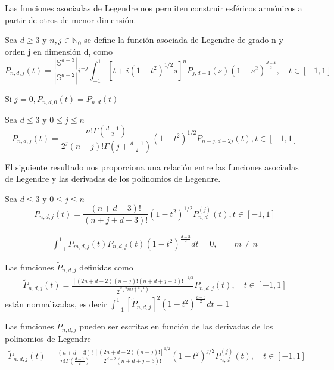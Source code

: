 Las funciones asociadas de Legendre nos permiten construir esféricos armónicos a partir de otros de menor dimensión.
\begin{defn}Sea $d\ge3$ y $n,j \in \mathds{N}_0$ se define la función asociada de Legendre de grado n y orden j en dimensión d, como
	$$
	P_{n,d,j}(t) = \frac{|\mathds{S}^{d-3}|}{|\mathds{S}^{d-2}|}i^{-j} \int_{-1}^{1}\left[t+i(1-t^2)^{1/2}s\right]^n P_{j,d-1}(s)(1-s^2)^{\frac{d-4}{2}}, \quad t\in[-1,1]
	$$
\end{defn}
\begin{rem}Si $j=0, P_{n,d,0}(t)=P_{n,d}(t)$
\end{rem}
\begin{prop}Sea $d\le3$ y $0\le j \le n$ 
	$$	P_{n,d,j}(t) = \frac{n!\Gamma(\frac{d-1}{2})}{2^j(n-j)!\Gamma(j+\frac{d-1}{2})}(1-t^2)^{1/2} P_{n-j,d+2j}(t), t\in[-1,1]$$
\end{prop}
El siguiente resultado nos proporciona una relación entre las funciones asociadas de Legendre y las derivadas de los polinomios de Legendre.
\begin{prop}Sea $d\le3$ y $0\le j \le n$ 
	$$	P_{n,d,j}(t) = \frac{(n+d-3)!}{(n+j+d-3)!}(1-t^2)^{1/2} P^{(j)}_{n,d}(t), t\in[-1,1]$$
\end{prop}
\begin{prop}
	\begin{gather*}
	\int_{-1}^{1} P_{m,d,j}(t)P_{n,d,j}(t)(1-t^2)^{\frac{d-3}{2}} dt = 0, \qquad m \neq n
	\end{gather*}
\end{prop}
\begin{prop} Las funciones $\tilde{P}_{n,d,j}$ definidas como
	\begin{gather*}
	\tilde{P}_{n,d,j}(t) = \frac{[(2n+d-2)(n-j)!(n+d+j-3)!]^{1/2}}{2^{\frac{d-2}{2}n!\Gamma(\frac{d-1}{2})}}P_{n,d,j}(t), \quad t\in[-1,1]
	\end{gather*}
	están normalizadas, es decir $\int_{-1}^{1} [	\tilde{P}_{n,d,j}]^2(1-t^2)^\frac{d-3}{2} dt = 1$
\end{prop}
\begin{rem}\label{note:fun_leg}Las funciones $	\tilde{P}_{n,d,j}$ pueden ser escritas en función de las derivadas de los polinomios de Legendre 
	\begin{gather*}
	\tilde{P}_{n,d,j}(t) =\frac{(n+d-3)!}{n!\Gamma(\frac{d-1}{2})} \frac{[(2n+d-2)(n-j)!]^{1/2}}{2^{d-2}(n+d+j-3)!}(1-t^2)^{j/2}P^{(j)}_{n,d}(t), \quad t\in[-1,1]
	\end{gather*}
\end{rem}
